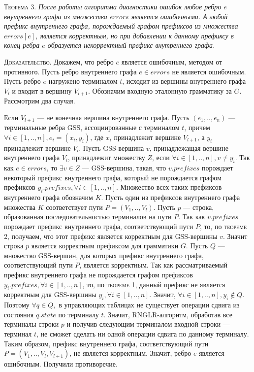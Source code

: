 \textsc{Теорема 3.}
\textit{После работы алгоритма диагностики ошибок любое ребро $e$ внутреннего графа из множества $errors$ является ошибочными. А любой префикс внутреннего графа, порождаемый графом префиксов из множества $errors[e]$, является корректным, но при добавлении к данному префиксу в конец ребра $e$ образуется некорректный префикс внутреннего графа.}

\textsc{Доказательство.}
Докажем, что ребро $e$ является ошибочным, методом от противного. Пусть ребро внутреннего графа $e \in errors$ не является ошибочным. Пусть ребро $e$ нагружено терминалом $t$, исходит из вершины внутреннего графа $V_{l}$ и входит в вершину $V_{l+1}$. Обозначим входную эталонную грамматику за $G$. Рассмотрим два случая.

Если $V_{l+1}$ --- не конечная вершина внутреннего графа. Пусть $(e_{1},..,e_{n})$ --- терминальные ребра GSS, ассоциированные с терминалом $t$, причем $\forall i \in [1,..,n], e_{i} = (x_{i},y_{i})$, где $x_{i}$ принадлежит вершине $V_{l+1}$, а $y_{i}$ принадлежит вершине $V_{l}$. Пусть GSS-вершина $v$, принадлежащая вершине внутреннего графа $V_{l}$, принадлежит множеству $Z$, если $\forall i \in [1,..,n], v \neq y_{i}$. Так как $e \in errors$, то $\exists v \in Z$ --- GSS-вершина, такая, что $v.prefixes$ порождает некоторый префикс внутреннего графа, который не порождается графом префиксов $y_{i}.prefixes, \forall i \in [1,..,n]$. Множество всех таких префиксов внутреннего графа обозначим $K$. Пусть один из префиксов внутреннего графа множества $K$ соответствует пути $P = (V_{1},..,V_{l})$. Пусть $p$ --- строка, образованная последовательностью терминалов на пути $P$. Так как $v.prefixes$ порождает префикс внутреннего графа, соответствующий пути $P$, то, по \textsc{теореме 2}, получаем, что этот префикс является корректным для GSS-вершины $v$. Значит строка $p$ является корректным префиксом для грамматики $G$. Пусть $Q$ --- множество GSS-вершин, для которых префикс внутреннего графа, соответствующий пути $P$, является корректным. Так как рассматриваемый префикс внутреннего графа не порождается графом префиксов $y_{i}.prefixes, \forall i \in [1,..,n]$, то, по \textsc{теореме 1}, данный префикс не является корректным для GSS-вершины $y_{i}, \forall i \in [1,..,n]$. Значит, $\forall i \in [1,..,n], y_{i} \notin Q$. Поэтому $\forall q \in Q,$ в управляющих таблицах не существует операции сдвига из состояния $q.state$ по терминалу $t$. Значит, RNGLR-алгоритм, обработав все терминалы строки $p$ и получив следующим терминалом входной строки --- терминал $t$, не сможет сделать ни одной операции сдвига по данному терминалу. Таким образом, префикс внутреннего графа, соответствующий пути $P = (V_{1},..,V_{l},V_{l+1})$, не является корректным. Значит, ребро $e$ является ошибочным. Получили противоречие.

